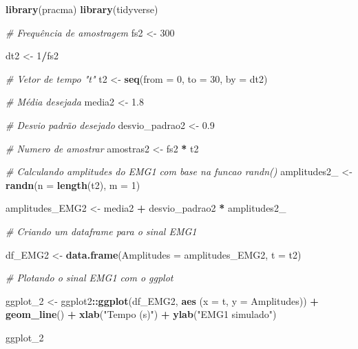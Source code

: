 \documentclass[
]{article}
\newenvironment{Shaded}{\begin{snugshade}}{\end{snugshade}}
\newcommand{\AttributeTok}[1]{\textcolor[rgb]{0.13,0.29,0.53}{#1}}
\newcommand{\CommentTok}[1]{\textcolor[rgb]{0.56,0.35,0.01}{\textit{#1}}}
\newcommand{\DecValTok}[1]{\textcolor[rgb]{0.00,0.00,0.81}{#1}}
\newcommand{\FloatTok}[1]{\textcolor[rgb]{0.00,0.00,0.81}{#1}}
\newcommand{\FunctionTok}[1]{\textcolor[rgb]{0.13,0.29,0.53}{\textbf{#1}}}
\newcommand{\NormalTok}[1]{#1}
\newcommand{\OtherTok}[1]{\textcolor[rgb]{0.56,0.35,0.01}{#1}}
\newcommand{\SpecialCharTok}[1]{\textcolor[rgb]{0.81,0.36,0.00}{\textbf{#1}}}
\newcommand{\StringTok}[1]{\textcolor[rgb]{0.31,0.60,0.02}{#1}}
\begin{document}
\begin{Shaded}
\begin{Highlighting}[]
\FunctionTok{library}\NormalTok{(pracma)}
\FunctionTok{library}\NormalTok{(tidyverse)}

\CommentTok{\# Frequência de amostragem}
\NormalTok{fs2 }\OtherTok{\textless{}{-}} \DecValTok{300}

\NormalTok{dt2 }\OtherTok{\textless{}{-}} \DecValTok{1}\SpecialCharTok{/}\NormalTok{fs2}

\CommentTok{\# Vetor de tempo "t"}
\NormalTok{t2 }\OtherTok{\textless{}{-}} \FunctionTok{seq}\NormalTok{(}\AttributeTok{from =} \DecValTok{0}\NormalTok{, }\AttributeTok{to =} \DecValTok{30}\NormalTok{, }\AttributeTok{by =}\NormalTok{ dt2)}

\CommentTok{\# Média desejada}
\NormalTok{media2 }\OtherTok{\textless{}{-}} \FloatTok{1.8}

\CommentTok{\# Desvio padrão desejado}
\NormalTok{desvio\_padrao2 }\OtherTok{\textless{}{-}} \FloatTok{0.9}

\CommentTok{\# Numero de amostrar}
\NormalTok{amostras2 }\OtherTok{\textless{}{-}}\NormalTok{ fs2 }\SpecialCharTok{*}\NormalTok{ t2}

\CommentTok{\# Calculando amplitudes do EMG1 com base na funcao randn()}
\NormalTok{amplitudes2\_ }\OtherTok{\textless{}{-}} \FunctionTok{randn}\NormalTok{(}\AttributeTok{n =} \FunctionTok{length}\NormalTok{(t2), }\AttributeTok{m =} \DecValTok{1}\NormalTok{)}

\NormalTok{amplitudes\_EMG2 }\OtherTok{\textless{}{-}}\NormalTok{ media2 }\SpecialCharTok{+}\NormalTok{ desvio\_padrao2 }\SpecialCharTok{*}\NormalTok{ amplitudes2\_}

\CommentTok{\# Criando um dataframe para o sinal EMG1}

\NormalTok{df\_EMG2 }\OtherTok{\textless{}{-}} \FunctionTok{data.frame}\NormalTok{(}\AttributeTok{Amplitudes =}\NormalTok{ amplitudes\_EMG2, }\AttributeTok{t =}\NormalTok{ t2)}

\CommentTok{\# Plotando o sinal EMG1 com o ggplot}

\NormalTok{ggplot\_2 }\OtherTok{\textless{}{-}}\NormalTok{ ggplot2}\SpecialCharTok{::}\FunctionTok{ggplot}\NormalTok{(df\_EMG2, }\FunctionTok{aes}\NormalTok{ (}\AttributeTok{x =}\NormalTok{ t, }\AttributeTok{y =}\NormalTok{ Amplitudes)) }\SpecialCharTok{+}
  \FunctionTok{geom\_line}\NormalTok{() }\SpecialCharTok{+}
  \FunctionTok{xlab}\NormalTok{(}\StringTok{"Tempo (s)"}\NormalTok{) }\SpecialCharTok{+}
  \FunctionTok{ylab}\NormalTok{(}\StringTok{"EMG1 simulado"}\NormalTok{)}

\NormalTok{ggplot\_2}
\end{Highlighting}
\end{Shaded}
\end{document}
